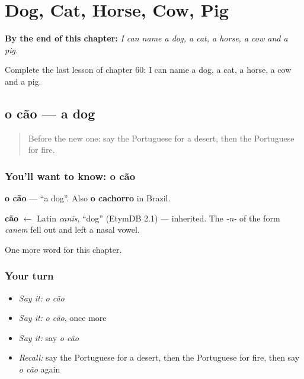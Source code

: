 
\chapter{Dog, Cat, Horse, Cow, Pig}
\label{ch:pt-dog-cat-horse-cow-pig}

\begin{chapteropening}
\textbf{By the end of this chapter:} \emph{I can name a dog, a cat, a horse, a cow and a pig.}

Complete the last lesson of chapter 60: I can name a dog, a cat, a horse, a cow and a pig.
\end{chapteropening}

\section[o cão]{o cão — a dog}

\label{lesson:PT-C60-cao}



\begin{quote}
Before the new one: say the Portuguese for a desert, then the Portuguese for fire.
\end{quote}

\subsection*{You'll want to know: o cão}
\textbf{o cão} — \textquotedblleft{}a dog\textquotedblright{}. Also \textbf{o cachorro} in Brazil.

\begin{cousinweb}
\textbf{cão} $\leftarrow$ Latin \emph{canis}, \textquotedblleft{}dog\textquotedblright{} (EtymDB 2.1) — inherited. The \emph{-n-} of the form \emph{canem} fell out and left a nasal vowel.
\end{cousinweb}

\begin{grammarlens}[title={What you've built}]
One more word for this chapter.
\end{grammarlens}

\subsection*{Your turn}
\begin{itemize}
\raggedright
  \item \emph{Say it:} \emph{o cão}
  \item \emph{Say it:} \emph{o cão}, once more
  \item \emph{Say it:} say \emph{o cão}
  \item \emph{Recall:} say the Portuguese for a desert, then the Portuguese for fire, then say \emph{o cão} again
\end{itemize}

